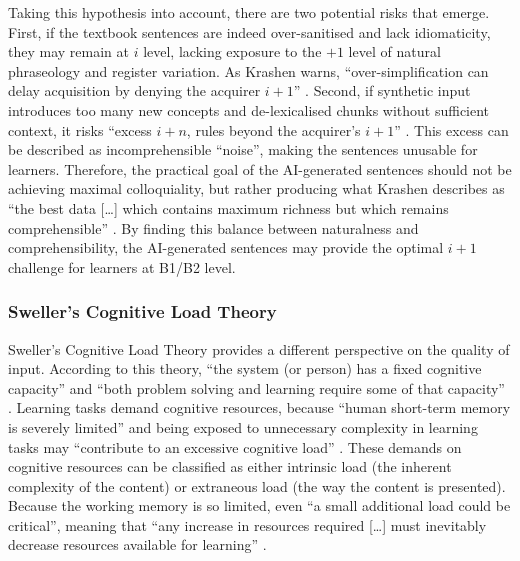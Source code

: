 \documentclass[11pt,a4paper]{article}
\begin{document}
Taking this hypothesis into account, there are two potential risks that emerge. First, if the textbook sentences are indeed over-sanitised and lack idiomaticity, they may remain at $i$ level, lacking exposure to the $+1$ level of natural phraseology and register variation. As Krashen warns, ``over-simplification can delay acquisition by denying the acquirer $i+1$'' \parencite[24]{krashenInputHypothesisIssues1985}. Second, if synthetic input introduces too many new concepts and de-lexicalised chunks without sufficient context, it risks ``excess $i+n$, rules beyond the acquirer's $i+1$'' \parencite[24]{krashenInputHypothesisIssues1985}. This excess can be described as incomprehensible ``noise'', making the sentences unusable for learners. Therefore, the practical goal of the AI-generated sentences should not be achieving maximal colloquiality, but rather producing what Krashen describes as ``the best data [\ldots] which contains maximum richness but which remains comprehensible'' \parencite[27]{krashenInputHypothesisIssues1985}. By finding this balance between naturalness and comprehensibility, the AI-generated sentences may provide the optimal $i+1$ challenge for learners at B1/B2 level.

\subsubsection{Sweller's Cognitive Load Theory}\label{subsubsec:sweller}

Sweller's Cognitive Load Theory \parencite*{swellerCognitiveLoadProblem1988a} provides a different perspective on the quality of input. According to this theory, ``the system (or person) has a fixed cognitive capacity'' and ``both problem solving and learning require some of that capacity'' \parencite[275]{swellerCognitiveLoadProblem1988a}. Learning tasks demand cognitive resources, because ``human short-term memory is severely limited'' and being exposed to unnecessary complexity in learning tasks may ``contribute to an excessive cognitive load'' \parencite[265]{swellerCognitiveLoadProblem1988a}. These demands on cognitive resources can be classified as either intrinsic load (the inherent complexity of the content) or extraneous load (the way the content is presented). Because the working memory is so limited, even ``a small additional load could be critical'', meaning that ``any increase in resources required [\ldots] must inevitably decrease resources available for learning'' \parencite[275]{swellerCognitiveLoadProblem1988a}.
\end{document}
